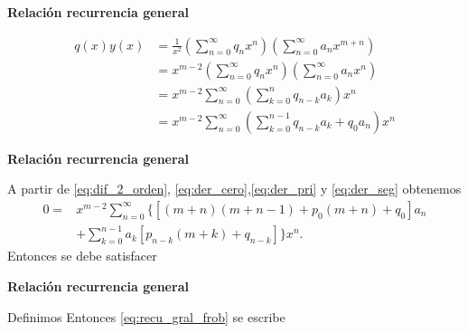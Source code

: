 \begin{frame}[fragile]{\textbf{Relación recurrencia general}}

\begin{equation}\label{eq:der_cero}
  \begin{split}
    q(x)y(x)&=\frac{1}{x^2}\left(\sum_{n=0}^{\infty}q_nx^n\right)\left(\sum_{n=0}^{\infty}a_{n}x^{m+n}\right)\\
&=x^{m-2}\left(\sum_{n=0}^{\infty}q_nx^n\right)\left(\sum_{n=0}^{\infty}a_{n}x^{n}\right)\\
&= x^{m-2}\sum_{n=0}^{\infty}\left(\sum_{k=0}^nq_{n-k}a_k\right)x^n\\
&= x^{m-2}\sum_{n=0}^{\infty}\left(\sum_{k=0}^{n-1}q_{n-k}a_k+q_0a_n\right)x^n
  \end{split}
\end{equation}
\end{frame}




\begin{frame}[fragile]{\textbf{Relación recurrencia general}}


A partir de \eqref{eq:dif_2_orden}, \eqref{eq:der_cero},\eqref{eq:der_pri} y \eqref{eq:der_seg} obtenemos
\begin{equation}
\begin{split}
  0=&x^{m-2}\sum_{n=0}^{\infty}\bigg\{\left[(m+n)(m+n-1)+p_0(m+n)  +q_0  \right] a_{n}\\&+\sum_{k=0}^{n-1}a_k\left[p_{n-k}(m+k) +
q_{n-k}\right]\bigg\}x^n.
\end{split}
\end{equation}
Entonces se debe satisfacer





\end{frame}




\begin{frame}[fragile]{\textbf{Relación recurrencia general}}



Definimos
Entonces \eqref{eq:recu_gral_frob} se escribe

\end{frame}





